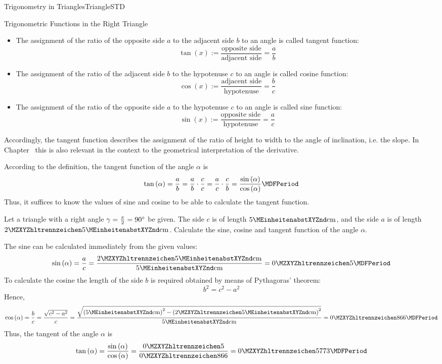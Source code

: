 \begin{MXContent}{Trigonometry in Triangles}{Triangle}{STD}
\begin{MXInfo}{Trigonometric Functions in the Right Triangle}
\begin{itemize}
\item
The assignment of the ratio of the opposite side $a$ to the adjacent side $b$ to an angle 
is called tangent function:
\[
\tan(x) := \frac{\text{opposite side}}{\text{adjacent side}} = \frac{a}{b} %
\]
%
\item
The assignment of the ratio of the adjacent side $b$ to the hypotenuse $c$ to an angle 
is called cosine function:
\[
\cos(x) := \frac{\text{adjacent side}}{\text{hypotenuse}} = \frac{b}{c} %
\]
%
\item
The assignment of the ratio of the opposite side $a$ to the hypotenuse $c$ 
to an angle is called sine function:
\[
\sin(x) := \frac{\text{opposite side}}{\text{hypotenuse}} = \frac{a}{c} %
\]
\end{itemize}
\end{MXInfo}

Accordingly, the tangent function describes the assignment of the ratio 
of height to width to the angle of inclination, i.e. the slope. In 
Chapter~ this is also relevant in the context to the 
geometrical interpretation of the derivative.

According to the definition, the tangent function of the angle 
$\alpha$ is
\[
\tan\left(\alpha\right)=\frac{a}{b}=\frac{a}{b}\cdot\frac{c}{c} %
 =\frac{a}{c}\cdot\frac{c}{b} %
 =\frac{\sin\left(\alpha\right)}{\cos\left(\alpha\right)} \MDFPeriod %
\]
Thus, it suffices to know the values of sine and cosine   
to be able to calculate the tangent function.

\begin{MExample}
Let a triangle with a right angle $\gamma=\frac{\pi}{2}=90^{\circ}$ be given.
The side $c$ is of length $5\MEinheit{cm}$, and the side $a$ is of length 
$\MZahl{2}{5}\MEinheit{cm}$. Calculate the sine, cosine and tangent function 
of the angle $\alpha$.

The sine can be calculated immediately from the given values:
\[
\sin\left(\alpha\right)=\frac{a}{c}
 =\frac{\MZahl{2}{5}\MEinheit{cm}}{5\MEinheit{cm}}=\MZahl{0}{5} \MDFPeriod\]
To calculate the cosine the length of the side $b$ is required obtained
by means of Pythagoras' theorem:
\[
b^2 = c^2 - a^2 %
\]
Hence,
\[
\cos\left(\alpha\right)=\frac{b}{c}=\frac{\sqrt{c^2-a^2}}{c} %
 =\frac{\sqrt{\left(5\MEinheit{cm}\right)^2 - \left(\MZahl{2}{5}\MEinheit{cm}\right)^2}}{5\MEinheit{cm}}=\MZahl{0}{866} \MDFPeriod %
\]
Thus, the tangent of the angle $\alpha$ is 
\[
\tan\left(\alpha\right) %
 =\frac{\sin\left(\alpha\right)}{\cos\left(\alpha\right)} %
 =\frac{\MZahl{0}{5}}{\MZahl{0}{866}}=\MZahl{0}{5773} \MDFPeriod
\]
\end{MExample}



\end{MXContent}

